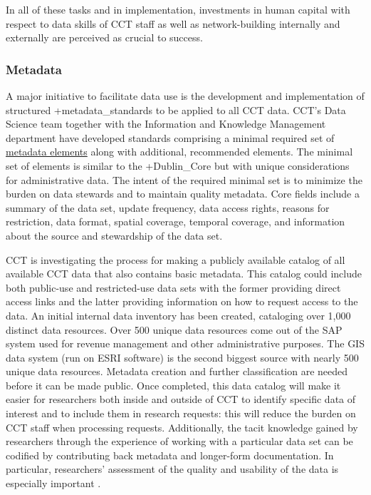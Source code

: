 \documentclass[
]{WileySix}
\begin{document}
In all of these tasks and in implementation, investments in human capital with respect to data skills of CCT staff as well as network-building internally and externally are perceived as crucial to success.

\hypertarget{metadata-2}{%
\subsubsection{Metadata}\label{metadata-2}}

A major initiative to facilitate data use is the development and implementation of structured +metadata\_standards\textbar{} to be applied to all CCT data. CCT's Data Science team together with the Information and Knowledge Management department have developed standards comprising a minimal required set of \href{http://osf.io/2a7ev}{metadata elements} along with additional, recommended elements. The minimal set of elements is similar to the +Dublin\_Core\textbar{} but with unique considerations for administrative data. The intent of the required minimal set is to minimize the burden on data stewards and to maintain quality metadata. Core fields include a summary of the data set, update frequency, data access rights, reasons for restriction, data format, spatial coverage, temporal coverage, and information about the source and stewardship of the data set.

CCT is investigating the process for making a publicly available catalog of all available CCT data that also contains basic metadata. This catalog could include both public-use and restricted-use data sets with the former providing direct access links and the latter providing information on how to request access to the data. An initial internal data inventory has been created, cataloging over 1,000 distinct data resources. Over 500 unique data resources come out of the SAP system used for revenue management and other administrative purposes. The GIS data system (run on ESRI software) is the second biggest source with nearly 500 unique data resources. Metadata creation and further classification are needed before it can be made public. Once completed, this data catalog will make it easier for researchers both inside and outside of CCT to identify specific data of interest and to include them in research requests: this will reduce the burden on CCT staff when processing requests. Additionally, the tacit knowledge gained by researchers through the experience of working with a particular data set can be codified by contributing back metadata and longer-form documentation. In particular, researchers' assessment of the quality and usability of the data is especially important \citep{connelly2016}.
\end{document}

